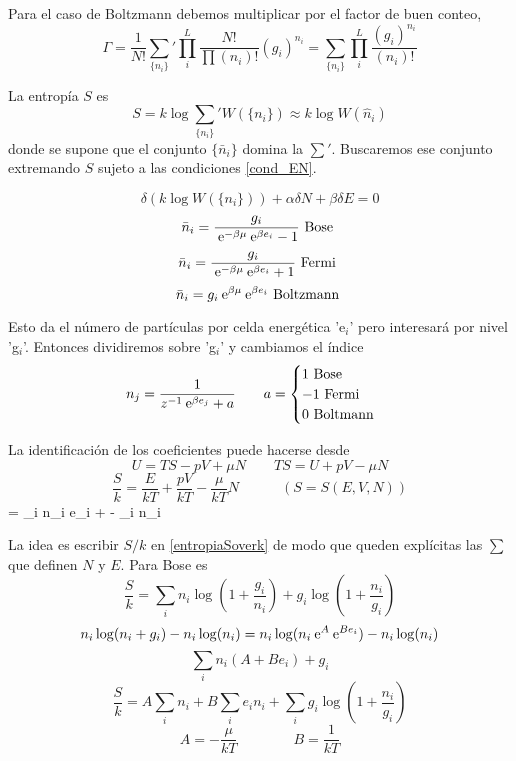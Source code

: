 \documentclass[10pt,oneside]{CBFT_book}
\begin{document}
Para el caso de Boltzmann debemos multiplicar por el factor de buen conteo,
\[
	\Gamma = \frac{1}{N!} \sum_{ \{ n_i \} }' \prod_i^L \frac{N!}{\prod (n_i)!}(g_i)^{n_i}
	= \sum_{ \{ n_i \} } \prod_i^L \frac{ (g_i)^{n_i} }{ (n_i)! }
\]

La entropía $S$ es
\[
	S = k \log \sum_{ \{ n_i \} }' W ( \{ n_i \} ) \approx k \log W( \hat{n}_i )
\]
donde se supone que el conjunto $ \{ \bar{n}_i \}$ domina la $ \sum' $. Buscaremos ese conjunto
extremando $S$ sujeto a las condiciones \eqref{cond_EN}.

\[
	\delta ( k\log W( \{ n_i \} ) ) + \alpha \delta N + \beta \delta E = 0
\]
\[
	\bar{n}_i = \frac{ g_i }{ \:\mathrm{e}^{ -\beta \mu } \:\mathrm{e}^{ \beta e_i } - 1 } \text{ Bose }
\]
\[
	\bar{n}_i = \frac{ g_i }{ \:\mathrm{e}^{ -\beta \mu } \:\mathrm{e}^{ \beta e_i } + 1 } \text{ Fermi }
\]
\[
	\bar{n}_i =  g_i \:\mathrm{e}^{ \beta \mu } \:\mathrm{e}^{ \beta e_i } \text{ Boltzmann }
\]

Esto da el número de partículas por celda energética 'e$_i$' pero interesará por nivel 'g$_i$'.
Entonces dividiremos sobre 'g$_i$' y cambiamos el índice 
\[
	n_j = \frac{1}{z^{-1}\:\mathrm{e}^{\beta e_j} + a} \qquad 
	a = \begin{cases}
	 1 \text{ Bose } \\
	 -1 \text{ Fermi } \\
	 0 \text{ Boltmann }
	\end{cases}
\]

La identificación de los coeficientes puede hacerse desde 
\[
	U = TS - pV + \mu N \qquad TS = U  + pV - \mu N
\]
\[
	\frac{S}{k} = \frac{E}{kT} + \frac{pV}{kT} - \frac{\mu}{kT}N \qquad 
	\quad (S=S(E,V,N))
\]
\be
	 =  \sum_i n_i e_i +  -  \sum_i n_i
	\label{entropiaSoverk}
\ee

La idea es escribir $ S / k $ en \eqref{entropiaSoverk} de modo que queden explícitas las
$\sum$ que definen $N$ y $E$. Para Bose es 
\[
	\frac{S}{k} = \sum_i n_i \log \left( 1 + \frac{g_i}{n_i} \right) + 
	g_i \log \left( 1 + \frac{n_i}{g_i} \right)
\]
\[
	n_i \log ( n_i + g_i ) - n_i \log ( n_i ) = 
	n_i \log ( n_i \:\mathrm{e}^{A} \:\mathrm{e}^{Be_i} ) - n_i \log ( n_i )
\]
\[
	\sum_i n_i (A + Be_i) + g_i
\]
\[
	\frac{S}{k} = A \sum_i n_i + B \sum_i e_i n_i + \sum_i g_i \log \left( 1 + \frac{n_i}{g_i} \right)
\]
\[
	A = - \frac{ \mu }{ k T } \qquad \qquad B = \frac{1}{ kT }
\]
\end{document}
